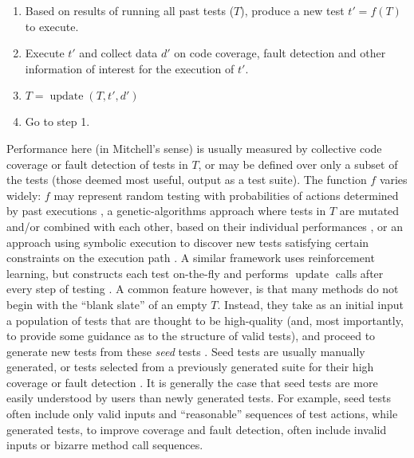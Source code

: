 \documentclass[final]{article}
\DeclareMathOperator{\Update}{update}
\begin{document}
\begin{enumerate}
\item Based on results of running all past tests ($T$), produce a new test
  $t' = f(T)$ to execute.
\item Execute $t'$ and collect data $d'$ on code coverage, fault detection and other
  information of interest for the execution of $t'$.
\item $T = \Update(T,t',d')$
\item Go to step 1.
\end{enumerate}

Performance here (in Mitchell's sense) is usually measured by
collective code coverage or fault detection of tests in $T$, or may be
defined over only a subset of the tests (those deemed most useful,
output as a test suite).  The function $f$ varies widely: $f$ may
represent random testing with probabilities of actions determined by
past executions \cite{AndrewsL07}, a genetic-algorithms approach where
tests in $T$ are mutated and/or combined with each other, based on
their individual performances
\cite{McMinn04search-basedsoftware,FA11,aflfuzz}, or an approach using
symbolic execution to discover new tests satisfying certain
constraints on the execution path \cite{Whitebox,GodefroidKS05,KLEE}.
A similar framework uses reinforcement learning, but constructs each
test on-the-fly and performs $\Update$ calls after every step of
testing \cite{ISSRE}.
A common feature however, is that many methods do not begin with the
``blank slate'' of an empty $T$.  Instead, they take as an initial
input a population of tests that are thought to be high-quality (and,
most importantly, to provide some guidance as to the structure of
valid tests), and proceed to generate new tests from these \emph{seed}
tests
\cite{aflfuzz,Person:2011:DIS:1993498.1993558,Marinescu:2012:MTS:2337223.2337308,issta14,STVR_seeding}.
Seed tests are usually manually generated, or tests selected from a
previously generated suite for their high coverage or fault detection
\cite{YooHarman,stvrcausereduce}.  It is generally the case that seed
tests are more easily understood by users than newly generated tests.
For example, seed tests often include only valid inputs and
``reasonable'' sequences of test actions, while generated tests, to
improve coverage and fault detection, often include invalid inputs or
bizarre method call sequences.
\end{document}
